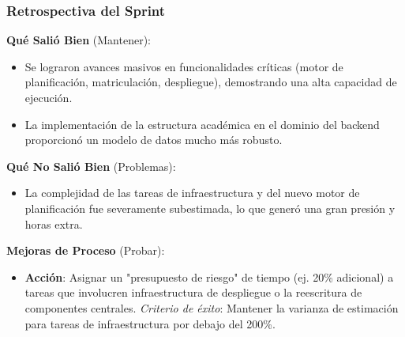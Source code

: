 \subsubsection{Retrospectiva del Sprint}

\textbf{Qué Salió Bien} (Mantener):
\begin{itemize}
    \item Se lograron avances masivos en funcionalidades críticas (motor de planificación, matriculación, despliegue), demostrando una alta capacidad de ejecución.
    \item La implementación de la estructura académica en el dominio del backend proporcionó un modelo de datos mucho más robusto.
\end{itemize}

\textbf{Qué No Salió Bien} (Problemas):
\begin{itemize}
    \item La complejidad de las tareas de infraestructura y del nuevo motor de planificación fue severamente subestimada, lo que generó una gran presión y horas extra.
\end{itemize}

\textbf{Mejoras de Proceso} (Probar):
\begin{itemize}
    \item \textbf{Acción}: Asignar un "presupuesto de riesgo" de tiempo (ej. 20\% adicional) a tareas que involucren infraestructura de despliegue o la reescritura de componentes centrales. \textit{Criterio de éxito}: Mantener la varianza de estimación para tareas de infraestructura por debajo del 200\%.
\end{itemize}
